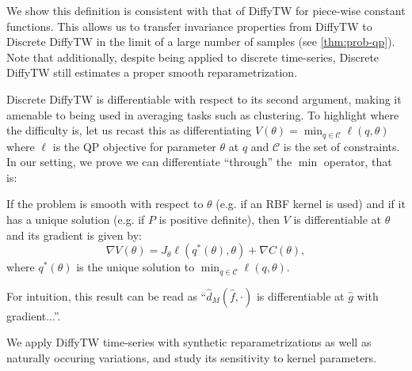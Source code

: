 We show this definition is consistent with that of DiffyTW for piece-wise constant functions. This allows us to transfer invariance properties from DiffyTW to Discrete DiffyTW in the limit of a large number of samples (see \cref{thm:prob-qp}). Note that additionally, despite being applied to discrete time-series, Discrete DiffyTW still estimates a proper smooth reparametrization.

Discrete DiffyTW is differentiable with respect to its second argument, making it amenable to being used in averaging tasks such as clustering. To highlight where the difficulty is, let us recast this as differentiating $V(\theta) = \min_{q\in\mathcal C}\ell(q, \theta)$ where $\ell$ is the QP objective for parameter $\theta$ at $q$ and $\mathcal C$ is the set of constraints. In our setting, we prove we can differentiate ``through'' the $\min$ operator, that is:
\begin{mdframed}
\begin{informaltheorem}
If the problem is smooth with respect to $\theta$ (e.g. if an RBF kernel is used) and if it has a unique solution (e.g. if $P$ is positive definite), then $V$ is differentiable at $\theta$ and its gradient is given by:
    \begin{equation}
        \nabla V(\theta) = J_\theta \ell(q^*(\theta), \theta) + \nabla C(\theta),
    \end{equation} where $q^*(\theta)$ is the unique solution to $\min_{q\in\mathcal C}\ell(q, \theta)$.
\end{informaltheorem}
\end{mdframed}
For intuition, this result can be read as ``$\hat d_M(\hat f, \cdot)$ is differentiable at $\hat g$ with gradient...''.

We apply DiffyTW time-series with synthetic reparametrizations as well as naturally occuring variations, and study its sensitivity to kernel parameters.

